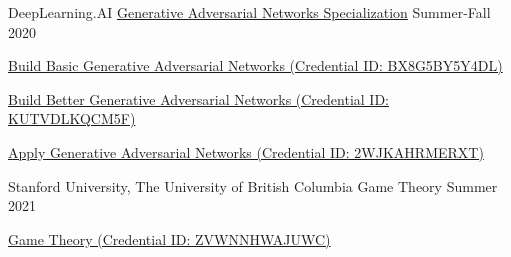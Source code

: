 

\begin{cventries}

  \cventry
    {DeepLearning.AI} %
    {\href{https://www.coursera.org/account/accomplishments/specialization/certificate/WT5VCNDDCB7V}{Generative Adversarial Networks Specialization}} %
    {} %
    {Summer-Fall 2020} %
    {
      \begin{cvitems} %
      	\item {\href{https://www.coursera.org/account/accomplishments/certificate/BX8G5BY5Y4DL}{Build Basic Generative Adversarial Networks (Credential ID: BX8G5BY5Y4DL)}}
      	\item {\href{https://www.coursera.org/account/accomplishments/certificate/KUTVDLKQCM5F}{Build Better Generative Adversarial Networks (Credential ID: KUTVDLKQCM5F)}}
      	\item {\href{https://www.coursera.org/account/accomplishments/certificate/2WJKAHRMERXT}{Apply Generative Adversarial Networks (Credential ID: 2WJKAHRMERXT)}}
      \end{cvitems}
    }

  \cventry
    {Stanford University, The University of British Columbia} %
    {Game Theory} %
    {} %
    {Summer 2021} %
    {
      \begin{cvitems} %
      	\item {\href{https://www.coursera.org/account/accomplishments/certificate/ZVWNNHWAJUWC}{Game Theory (Credential ID: ZVWNNHWAJUWC)}}
      \end{cvitems}
    }


\end{cventries}
